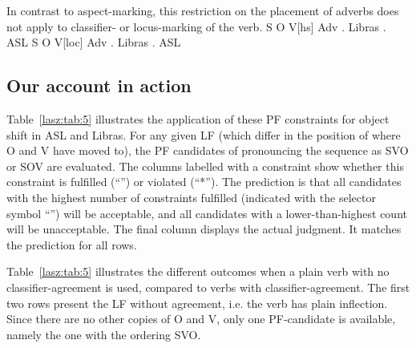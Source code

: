 \documentclass[output=paper]{langscibook}
\begin{document}
    \z 
\z 
In contrast to aspect-marking, this restriction on the placement of
adverbs does not apply to classifier-  or locus-marking  of the
verb.
\ea 
    \label{lasz:ex:17}
    S O V[hs] Adv
    \ea 
         \laszHs{\laszClaw} \textbf{}.
        \hfill 
        \cmark Libras
    \ex 
        \laszHs{\laszClaw} \textbf{}. 
        \hfill 
        \cmark ASL 
    \z 
\ex 
    \label{lasz:ex:18}
    S O V[loc] Adv
    \ea 
           \textbf{}. 
         \hfill 
         \cmark Libras
    \ex 
           \textbf{}.
        \hfill 
        \cmark ASL
    \z 
\z 

\subsection{Our account in action}
\label{lasz:sec:24}

Table~\ref{lasz:tab:5} illustrates the application of these PF constraints for object
shift in ASL and Libras. For any given LF (which differ in the position
of where O and V have moved to), the PF candidates of pronouncing
the sequence as SVO or SOV are evaluated. The columns labelled with a constraint 
show whether this constraint is fulfilled (“\cmark”) or violated (“*”).
The prediction is that all candidates with the highest number of
constraints fulfilled (indicated with the selector symbol “\HandLeft”) will be
acceptable, and all candidates with a lower-than-highest count will be
unacceptable. The final column displays the actual judgment. It 
matches the prediction for all rows. 

Table~\ref{lasz:tab:5} illustrates the different outcomes when a plain verb
with no classifier-agreement is used, compared to verbs with
classifier-agreement. The first two rows present the LF without
agreement, i.e. the verb has plain inflection. Since there are no other
copies of O and V, only one PF-candidate is available, namely the one
with the ordering SVO.
\end{document}
